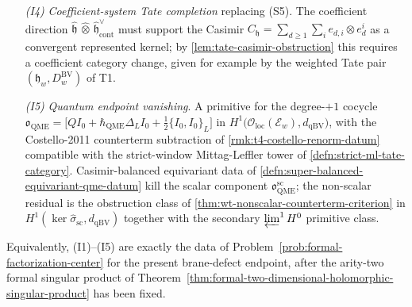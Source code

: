 \begin{thm}
\begin{enumerate}
{      \(\lie{gl}_N\) scalar contact decision} replacing (S3)--(S4).
      The vanishing must allow the transverse one-real-dimensional
      defect \(L\) carrying open gauge \(\lie{gl}_N\), with comparison to
      the flat-\(\C^d\) \(\lie{gl}(N\mid N)\) setup of
      \cite{costello-li-open-closed-bcov}*{Thm.~A, Thm.~B, Prop.~4.4.4},
      and must decide the scalar
      contact class
      \[
        \hbar_{\mathrm{QME}} N\,\omega(f,g)\,\gamma_{\mathbf 1}\in
        H^2_{\mathrm{Lie}}(\bar A,\C),
        \qquad\omega(z_1,z_2)=1,
      \]
      of \ref{thm:app-scalar-contact-qme-class}.  After a determinant
      line with connection has been fixed, this is the value of
      \(\Omega_{\mathrm{central}}\big|_{J(f)}\) at the trace generator
      (Theorem~\ref{thm:capelli-projective-anomaly}).  The class
      is then decided by one of the four named cancellations:
      closed-exchange cancellation,
      \(\C^{N|N}\) supertrace removal
      (\ref{thm:app-balanced-supertrace-qme-cancellation}),
      central-character normalization
      (\ref{thm:app-central-character-qme-cancellation}), or
      renormalized boundary generators.
    \item[\emph{(I4)}] \emph{Coefficient-system Tate completion}
      replacing (S5).  The coefficient direction
      \(\widehat{\mathfrak h}\,\widehat\otimes\,
        \widehat{\mathfrak h}^{\vee}_{\mathrm{cont}}\)
      must support the Casimir
      \(C_{\mathfrak h}=\sum_{d\ge1}\sum_ie_{d,i}\otimes e^i_d\)
      as a convergent represented kernel; by
      \ref{lem:tate-casimir-obstruction} this requires a coefficient
      category change, given for example by the weighted Tate pair
      \((\mathfrak h_w,D^{\mathrm{BV}}_w)\) of T1.
    \item[\emph{(I5)}] \emph{Quantum endpoint vanishing}.  A primitive
      for the degree-\(+1\) cocycle
      \(\mathfrak o_{\mathrm{QME}}=
        \bigl[QI_0+\hbar_{\mathrm{QME}}\Delta_LI_0+\tfrac12\{I_0,I_0\}_L\bigr]\)
      in \(H^1\!\bigl(\mathcal O_{\mathrm{loc}}(\mathcal E_w),
        d_{\mathrm{qBV}}\bigr)\), with the Costello-2011 counterterm subtraction
      of \ref{rmk:t4-costello-renorm-datum} compatible with the
      strict-window Mittag-Leffler tower of
      \ref{defn:strict-ml-tate-category}.  Casimir-balanced equivariant
      data of
      \ref{defn:super-balanced-equivariant-qme-datum} kill the scalar
      component
      \(\mathfrak o_{\mathrm{QME}}^{\mathrm{sc}}\); the non-scalar
      residual is the obstruction class of
      \ref{thm:wt-nonscalar-counterterm-criterion} in
      \(H^1(\ker\widehat\sigma_{\mathrm{sc}},d_{\mathrm{qBV}})\)
      together with the secondary
      \(\varprojlim^1H^0\) primitive class.
  \end{enumerate}
  Equivalently, (I1)--(I5) are exactly the data of
  Problem~\ref{prob:formal-factorization-center} for the present
  brane-defect endpoint, after the arity-two formal singular product of
  Theorem~\ref{thm:formal-two-dimensional-holomorphic-singular-product} has been
  fixed.
\end{thm}

